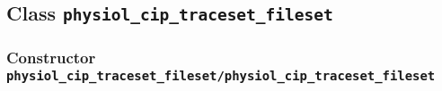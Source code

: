 \subsection{Class \texttt{physiol\_cip\_traceset\_fileset}}%
%
\label{ref_physiol_cip_traceset_fileset}%
\hypertarget{ref_physiol_cip_traceset_fileset}{}%
\subsubsection[Constructor \texttt{physiol\_cip\_traceset\_fileset}]{Constructor \texttt{physiol\_cip\_traceset\_fileset/physiol\_cip\_traceset\_fileset}}%
%
\label{ref_physiol_cip_traceset_fileset__physiol_cip_traceset_fileset}%
\hypertarget{ref_physiol_cip_traceset_fileset__physiol_cip_traceset_fileset}{}%
